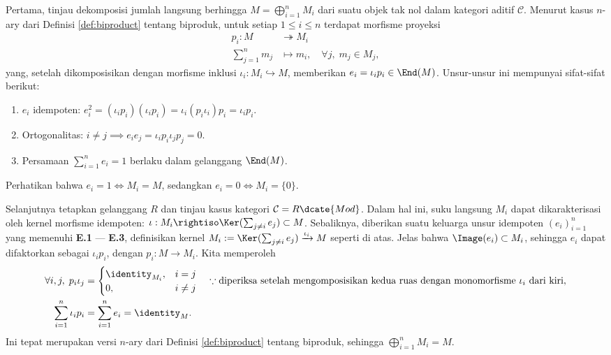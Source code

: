 Pertama, tinjau dekomposisi jumlah langsung berhingga $M = \bigoplus_{i=1}^n M_i$ dari suatu objek tak nol dalam kategori aditif $\mathcal{C}$. Menurut kasus $n$-ary dari Definisi \ref{def:biproduct} tentang biproduk, untuk setiap $1 \leq i \leq n$ terdapat morfisme proyeksi
\begin{align*}
	p_i: M & \twoheadrightarrow M_i \\
	\sum_{j=1}^n m_j & \mapsto m_i, \quad \forall j, \; m_j \in M_j,
\end{align*}
yang, setelah dikomposisikan dengan morfisme inklusi $\iota_i: M_i \hookrightarrow M$, memberikan $e_i = \iota_i p_i \in \End(M)$. Unsur-unsur ini mempunyai sifat-sifat berikut:
\begin{enumerate}[\bfseries {E}.1]
	\item $e_i$ idempoten: $e_i^2 = (\iota_i p_i) (\iota_i p_i) = \iota_i (p_i \iota_i) p_i = \iota_i p_i$.
	\item Ortogonalitas: $i \neq j \implies e_i e_j = \iota_i p_i \iota_j p_j = 0$.
	\item Persamaan $\sum_{i=1}^n e_i = 1$ berlaku dalam gelanggang $\End(M)$.
\end{enumerate}
Perhatikan bahwa $e_i = 1 \iff M_i = M$, sedangkan $e_i = 0 \iff M_i = \{0\}$.

Selanjutnya tetapkan gelanggang $R$ dan tinjau kasus kategori $\mathcal{C} = R\dcate{Mod}$. Dalam hal ini, suku langsung $M_i$ dapat dikarakterisasi oleh kernel morfisme idempoten: $\iota: M_i \rightiso \Ker(\sum_{j \neq i} e_j) \subset M$. Sebaliknya, diberikan suatu keluarga unsur idempoten $(e_i)_{i=1}^n$ yang memenuhi \textbf{E.1} --- \textbf{E.3}, definisikan kernel $M_i := \Ker(\sum_{j \neq i} e_j) \xrightarrow{\iota_i} M$ seperti di atas. Jelas bahwa $\Image(e_i) \subset M_i$, sehingga $e_i$ dapat difaktorkan sebagai $\iota_i p_i$, dengan $p_i: M \to M_i$. Kita memperoleh
\begin{align*}
	\forall i,j, \; p_i \iota_j & = \begin{cases}
		\identity_{M_i}, & i=j \\
		0, & i \neq j
	\end{cases} \quad \because\text{diperiksa setelah mengomposisikan kedua ruas dengan monomorfisme $\iota_i$ dari kiri}, \\
	\sum_{i=1}^n \iota_i p_i & = \sum_{i=1}^n e_i = \identity_M.
\end{align*}
Ini tepat merupakan versi $n$-ary dari Definisi \ref{def:biproduct} tentang biproduk, sehingga $\bigoplus_{i=1}^n M_i = M$.

